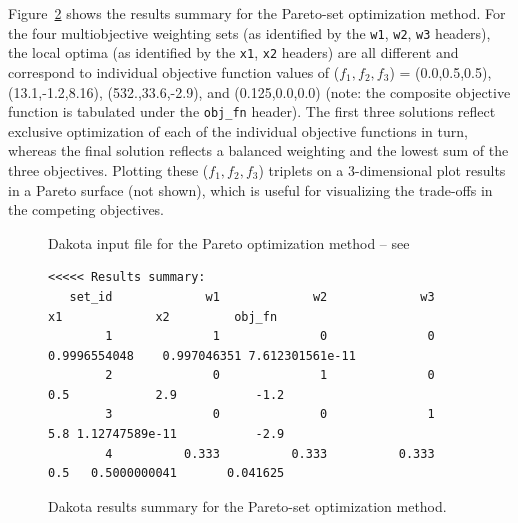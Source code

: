 Figure~\ref{adv_meth:figure05} shows the results summary for the
Pareto-set optimization method. For the four multiobjective
weighting sets (as identified by the \texttt{w1}, \texttt{w2},
\texttt{w3} headers), the local optima (as identified by the
\texttt{x1}, \texttt{x2} headers) are all different and correspond to
individual objective function values of ($f_1,f_2,f_3$) =
(0.0,0.5,0.5), (13.1,-1.2,8.16), (532.,33.6,-2.9), and (0.125,0.0,0.0)
(note: the composite objective function is tabulated under the
\texttt{obj\_fn} header).  The first three solutions reflect exclusive
optimization of each of the individual objective functions in turn,
whereas the final solution reflects a balanced weighting and the
lowest sum of the three objectives.  Plotting these ($f_1,f_2,f_3$)
triplets on a 3-dimensional plot results in a Pareto surface (not
shown), which is useful for visualizing the trade-offs in the
competing objectives.

\begin{figure}
  \centering
  \begin{bigbox}
    \begin{small}
    \end{small}
  \end{bigbox}
  \caption{Dakota input file for the Pareto optimization method --
see \protect{} }
  \label{adv_meth:figure04}
\end{figure}

\begin{figure}
\centering
\begin{bigbox}
\begin{scriptsize}
\begin{verbatim}
<<<<< Results summary:
   set_id             w1             w2             w3             x1             x2         obj_fn
        1              1              0              0   0.9996554048    0.997046351 7.612301561e-11
        2              0              1              0            0.5            2.9           -1.2
        3              0              0              1            5.8 1.12747589e-11           -2.9
        4          0.333          0.333          0.333            0.5   0.5000000041       0.041625
\end{verbatim}
\end{scriptsize}
\end{bigbox}
\caption{Dakota results summary for the Pareto-set optimization
  method.}
\label{adv_meth:figure05}
\end{figure}

